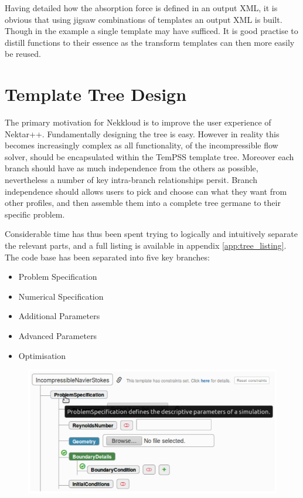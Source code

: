 \documentclass[11pt, a4paper]{report}
\begin{document}
Having detailed how the absorption force is defined in an output XML, it is obvious that using jigsaw combinations of templates an output XML is built. Though in the example a single template may have sufficed. It is good practise to distill functions to their essence as the transform templates can then more easily be reused.

\section{Template Tree Design}
The primary motivation for Nekkloud is to improve the user experience of Nektar++. Fundamentally designing the tree is easy. However in reality this becomes increasingly complex as all functionality, of the incompressible flow solver, should be encapsulated within the TemPSS template tree. Moreover each branch should have as much independence from the others as possible, nevertheless a number of key intra-branch relationships persit. Branch independence should allows users to pick and choose can what they want from other profiles, and then assemble them into a complete tree germane to their specific problem.

Considerable time has thus been spent trying to logically and intuitively separate the relevant parts, and a full listing is available in appendix \ref{app:tree_listing}. The code base has been separated into five key branches:

\begin{itemize}
\item Problem Specification
\item Numerical Specification
\item Additional Parameters
\item Advanced Parameters
\item Optimisation
\end{itemize}

\begin{figure}[htb!]
 \centering
 \includegraphics[width=.75\linewidth,  clip=true, trim = 0cm 0cm 0cm 0cm]{documentation}
 \label{fig:documentation}
\end{figure}
\end{document}
